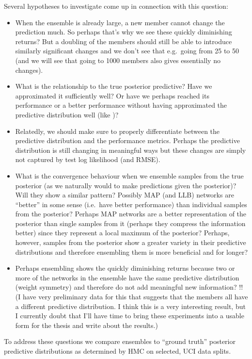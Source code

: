 \documentclass[../thesis.tex]{subfiles}
\begin{document}
Several hypotheses to investigate come up in connection with this question:
\begin{itemize}
    \item When the ensemble is already large, a new member cannot change the prediction much. So perhaps that's why we see these quickly diminishing returns? But a doubling of the members should still be able to introduce similarly significant changes and we don't see that e.g.\ going from 25 to 50 (and we will see that going to 1000 members also gives essentially no changes).
    \item What is the relationship to the true posterior predictive? Have we approximated it sufficiently well? Or have we perhaps reached its performance or a better performance without having approximated the predictive distribution well (like \parencite{yao2019quality})?
    \item Relatedly, we should make sure to properly differentiate between the predictive distribution and the performance metrics. Perhaps the predictive distribution is still changing in meaningful ways but these changes are simply not captured by test log likelihood (and RMSE).
    \item What is the convergence behaviour when we ensemble samples from the true posterior (as we naturally would to make predictions given the posterior)? Will they show a similar pattern? Possibly MAP (and LLB) networks are ``better'' in some sense (i.e.\ have better performance) than individual samples from the posterior? Perhaps MAP networks are a better representation of the posterior than single samples from it (perhaps they compress the information better) since they represent a local maximum of the posterior? Perhaps, however, samples from the posterior show a greater variety in their predictive distributions and therefore ensembling them is more beneficial and for longer?
    \item Perhaps ensembling shows the quickly diminishing returns because two or more of the networks in the ensemble have the same predictive distribution (weight symmetry) and therefore do not add meaningful new information? !! (I have very preliminary data for this that suggests that the members all have a different predictive distribution. I think this is a very interesting result, but I currently doubt that I'll have time to bring these experiments into a usable form for the thesis and write about the results.)
\end{itemize}
To address these questions we compare ensembles to ``ground truth'' posterior predictive distributions as determined by HMC on selected, UCI data splits.
\end{document}
